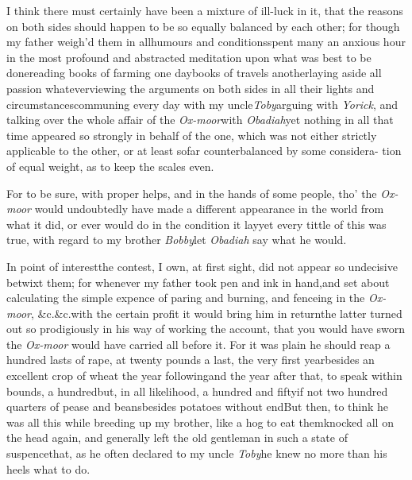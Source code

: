 \documentclass[twoside]{article}
\begin{document}
I think there must certainly have been a mixture of ill-luck in
it, that the reasons on both sides should happen to be so equally
balanced by each other; for though my father weigh’d them in
all\break humours and conditions\tsk spent many an anxious hour
in the most profound and abstracted meditation upon what was\break
best to be done\tsh reading books of farming one
day\tsk books of travels another\tsk laying aside
all passion whatever\break\tsk viewing the arguments on both sides in
all their lights and circumstances\tsk\break communing every day with
my uncle\break \textit{Toby}\tsk arguing with \textit{Yorick}, and talking
over the whole affair of the \textit{Ox-moor}\break with
\textit{Obadiah}\tsk yet nothing in all that time appeared
so strongly in behalf of the one, which was not either
strictly\break
applicable to the other, or at least so\break far counterbalanced
by some considera-
tion of equal weight, as to keep the scales even.

For to be sure, with proper helps,\break
and in the hands of some people, tho’\break
the \textit{Ox-moor} would undoubtedly have\break
made a different appearance in the world from what it did, or ever would
do in the condition it lay\tsk yet every tittle of this
was true, with regard to my brother \textit{Bobby}\tsk let
\textit{Obadiah} say what he\break
would.\tsh

In point of interest\tsk the contest, I own, at first
sight, did not appear so\break
undecisive betwixt them; for whenever my
father took pen and ink in hand,\break and set about calculating the
simple expence of paring and burning, and fence\-ing in the
\textit{Ox-moor}, \&c.\@ \&c.\tsk with the\break
certain profit it would bring him in return\tsk the latter turned out so
prodigiously in his way of working the account, that you would have
sworn the \textit{Ox-moor} would have carried all before it. For it
was plain he should reap a hundred lasts of rape, at twenty pounds a last, the very first
year\tsk besides an excellent crop of wheat the year
following\tsk and the year after that, to speak within
bounds, a hundred\tsh but, in all likelihood, a hundred and
fifty\tsk if not two hundred quarters of pease and
beans\tsk besides potatoes without end\tsk But
then, to think he was all this while breeding up my brother, like a
hog to eat them\tsk knocked all on the head again, and
generally left the old gentleman in such a state of
suspence\tsk that, as he often declared to my uncle
\textit{Toby}\tsk he knew no more than his heels what to
do.
\end{document}
